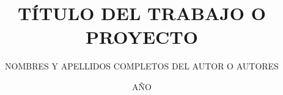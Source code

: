 \documentclass{icontec}
\title{TÍTULO DEL TRABAJO O PROYECTO}
\author{NOMBRES Y APELLIDOS COMPLETOS DEL AUTOR O AUTORES}
\date{AÑO}
\begin{document}
\maketitle

\makeapprobation

\tableofcontents

\listoffigures

\listoftables

\Blinddocument
\end{document}
